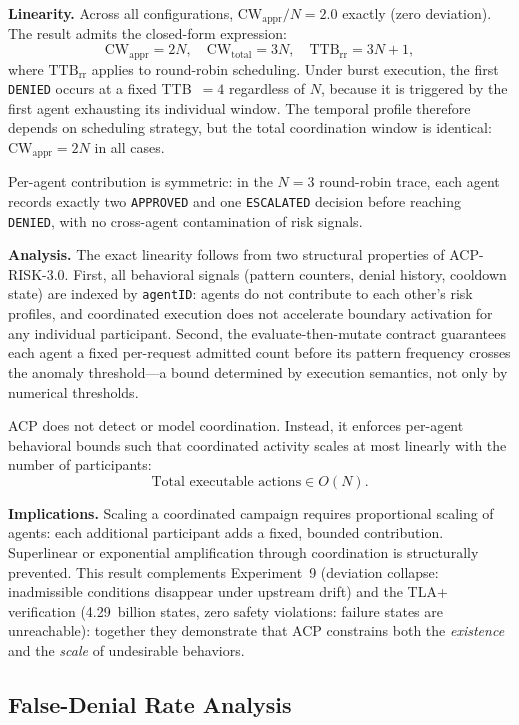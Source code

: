 \documentclass[11pt]{article}
\theoremstyle{definition}
\begin{document}
\textbf{Linearity.}
Across all configurations, $\mathrm{CW}_\mathrm{appr}/N = 2.0$ exactly
(zero deviation).
The result admits the closed-form expression:
\[
  \mathrm{CW}_\mathrm{appr} = 2N, \quad
  \mathrm{CW}_\mathrm{total} = 3N, \quad
  \mathrm{TTB}_\mathrm{rr} = 3N + 1,
\]
where $\mathrm{TTB}_\mathrm{rr}$ applies to round-robin scheduling.
Under burst execution, the first \texttt{DENIED} occurs at a fixed
TTB~$= 4$ regardless of $N$, because it is triggered by the first agent
exhausting its individual window.
The temporal profile therefore depends on scheduling strategy, but the total
coordination window is identical: $\mathrm{CW}_\mathrm{appr} = 2N$ in all
cases.

Per-agent contribution is symmetric: in the $N=3$ round-robin trace,
each agent records exactly two \texttt{APPROVED} and one
\texttt{ESCALATED} decision before reaching \texttt{DENIED},
with no cross-agent contamination of risk signals.

\textbf{Analysis.}
The exact linearity follows from two structural properties of ACP-RISK-3.0.
First, all behavioral signals (pattern counters, denial history, cooldown
state) are indexed by \texttt{agentID}: agents do not contribute to each
other's risk profiles, and coordinated execution does not accelerate boundary
activation for any individual participant.
Second, the evaluate-then-mutate contract guarantees each agent a fixed
per-request admitted count before its pattern frequency crosses the anomaly
threshold---a bound determined by execution semantics, not only by numerical
thresholds.

ACP does not detect or model coordination.
Instead, it enforces per-agent behavioral bounds such that coordinated activity
scales at most linearly with the number of participants:
\[
  \text{Total executable actions} \in O(N).
\]

\textbf{Implications.}
Scaling a coordinated campaign requires proportional scaling of agents:
each additional participant adds a fixed, bounded contribution.
Superlinear or exponential amplification through coordination is structurally
prevented.
This result complements Experiment~9 (deviation collapse: inadmissible
conditions disappear under upstream drift) and the TLA+ verification
(4.29~billion states, zero safety violations: failure states are unreachable):
together they demonstrate that ACP constrains both the \emph{existence} and
the \emph{scale} of undesirable behaviors.

\subsection{False-Denial Rate Analysis}
\label{sec:false-denial}
\end{document}

